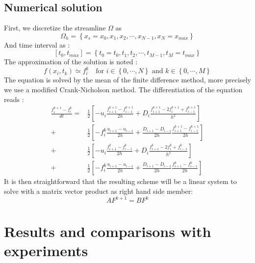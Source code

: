 \documentclass[10pt,a4paper,twocolumn]{article}
\begin{document}
\subsection{Numerical solution}
First, we discretize the streamline $\Omega$ as \[\Omega_h = \left\lbrace x_s = x_0, x_1, x_2, \cdots, x_{N-1}, x_N = x_{max} \right\rbrace \]
And time interval as : 
\[[t_0, t_{max}] = \left\lbrace t_0 = t_0, t_1, t_2, \cdots, t_{M-1}, t_M = t_{max} \right\rbrace \]
The approximation of the solution is noted :
 \[f(x_i, t_k) \simeq f_i^k \: \: \:   \text{    for } i \in \left\lbrace 0, \cdots, N\right\rbrace  \text{ and } k \in \left\lbrace 0, \cdots, M \right\rbrace  \]
The equation is solved by the mean of the finite difference method, more precisely we use a modified Crank-Nicholson method. The differentiation of the equation reads : 
\useshortskip
\begin{align*}\label{eq:CrankNicolson}
\frac{f_i^{k+1} - f_i^{k}}{dt} =& \frac{1}{2} \left[ - u_i \frac{f_{i+1}^{k+1} - f_{i-1}^{k+1}}{2h} 
				+ D_i \frac{f_{i+1}^{k+1} - 2 f_{i}^{k+1} + f_{i-1}^{k+1}}{h^{2}}  \right] \\
				+& \frac{1}{2} \left[-f_i^k \frac{u_{i+1} - u_{i-1} }{2h}
				+ \frac{D_{i+1} - D_{i-1} }{2h} \frac{f_{i+1}^{k+1} - f_{i-1}^{k+1}}{2h} \right] \\ 								
				+ &\frac{1}{2} \left[ - u_i \frac{f_{i+1}^{k} - f_{i-1}^{k}}{2h} 
				+ D_i \frac{f_{i+1}^{k} - 2 f_{i}^{k} + f_{i-1}^{k}}{h^{2}} \right] \\
				+ &\frac{1}{2} \left[-f_i^k \frac{u_{i+1} - u_{i-1} }{2h}
				+ \frac{D_{i+1} - D_{i-1} }{2h} \frac{f_{i+1}^{k} - f_{i-1}^{k}}{2h} \right] \
\end{align*}
It is then straightforward that the resulting scheme will be a linear system to solve with a matrix vector product as right hand side member: 
\[ A F^{k+1} = B F^k\]



\section{Results and comparisons with experiments}
\end{document}
